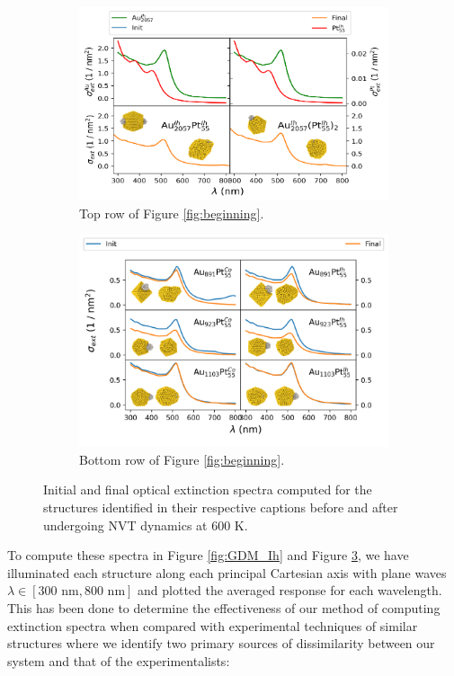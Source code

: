 \begin{figure}
\begin{subfigure}{0.8\textwidth}
    \centering
    \includegraphics[width=\textwidth]{figures/MD/Coal/Micki_Specs.pdf}
    \caption{Top row of Figure \ref{fig:beginning}.}
    \label{fig:GDM_Micki}
\end{subfigure}
\begin{subfigure}{0.8\textwidth}
    \centering
    \includegraphics[width=\textwidth]{figures/MD/Coal/Seed_Spec.pdf}
    \caption{Bottom row of Figure \ref{fig:beginning}.}
    \label{fig:GDM_Long}
\end{subfigure}
    \caption{Initial and final optical extinction spectra computed for the structures identified in their respective captions before and after undergoing NVT dynamics at $600$ K.}
    \label{fig:GDM_Dyns}
\end{figure}


To compute these spectra in Figure \ref{fig:GDM_Ih} and Figure  \ref{fig:GDM_Dyns}, we have illuminated each structure along each principal Cartesian axis with plane waves $\lambda \in [300 \text{ nm}, 800\text{ nm}]$ and plotted the averaged response for each wavelength. This has been done to determine the effectiveness of our method of computing extinction spectra when compared with experimental techniques of similar structures \cite{JorgeStructure} where we identify two primary sources of dissimilarity between our system and that of the experimentalists:

